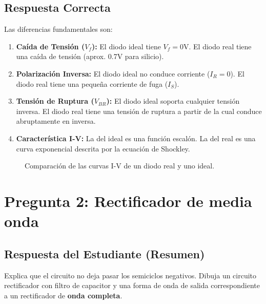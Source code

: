 \documentclass[12pt, a4paper]{article}
\begin{document}
\subsection*{Respuesta Correcta}
Las diferencias fundamentales son:
\begin{enumerate}
    \item \textbf{Caída de Tensión ($V_f$):} El diodo ideal tiene $V_f = 0$V. El diodo real tiene una caída de tensión (aprox. 0.7V para silicio).
    \item \textbf{Polarización Inversa:} El diodo ideal no conduce corriente ($I_R = 0$). El diodo real tiene una pequeña corriente de fuga ($I_S$).
    \item \textbf{Tensión de Ruptura ($V_{BR}$):} El diodo ideal soporta cualquier tensión inversa. El diodo real tiene una tensión de ruptura a partir de la cual conduce abruptamente en inversa.
    \item \textbf{Característica I-V:} La del ideal es una función escalón. La del real es una curva exponencial descrita por la ecuación de Shockley.
\end{enumerate}

\begin{figure}[h!]
    \centering
    \caption{Comparación de las curvas I-V de un diodo real y uno ideal.}
\end{figure}

\newpage

\section{Pregunta 2: Rectificador de media onda}

\subsection*{Respuesta del Estudiante (Resumen)}
Explica que el circuito no deja pasar los semiciclos negativos. Dibuja un circuito rectificador con filtro de capacitor y una forma de onda de salida correspondiente a un rectificador de \textbf{onda completa}.
\end{document}

